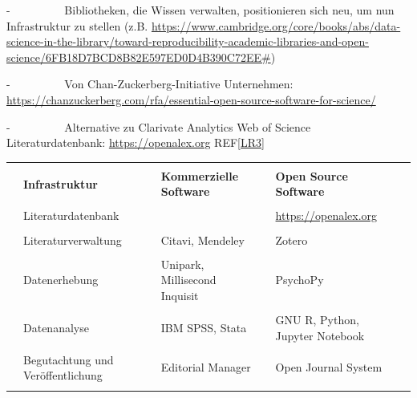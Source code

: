 \documentclass[
  letterpaper,
  DIV=11,
  numbers=noendperiod]{scrreprt}
\begin{document}
-~~~~~~~~~ Bibliotheken, die Wissen verwalten, positionieren sich neu,
um nun Infrastruktur zu stellen (z.B.
\href{https://www.cambridge.org/core/books/abs/data-science-in-the-library/toward-reproducibility-academic-libraries-and-open-science/6FB18D7BCD8B82E597ED0D4B390C72EE}{https://www.cambridge.org/core/books/abs/data-science-in-the-library/toward-reproducibility-academic-libraries-and-open-science/6FB18D7BCD8B82E597ED0D4B390C72EE\#})

-~~~~~~~~~ Von Chan-Zuckerberg-Initiative Unternehmen:
\url{https://chanzuckerberg.com/rfa/essential-open-source-software-for-science/}

-~~~~~~~~~ Alternative zu Clarivate Analytics Web of Science
Literaturdatenbank: \url{https://openalex.org}
REF\hyperref[_msocom_3]{{[}LR3{]}}~

\begin{longtable}[]{@{}
  >{\raggedright\arraybackslash}p{}
  >{\raggedright\arraybackslash}p{}
  >{\raggedright\arraybackslash}p{}
  >{\raggedright\arraybackslash}p{}
  >{\raggedright\arraybackslash}p{}
  >{\raggedright\arraybackslash}p{}
  >{\raggedright\arraybackslash}p{}@{}}
\toprule\noalign{}
\endhead
\bottomrule\noalign{}
\endlastfoot
& & & & & & \\
& \textbf{Infrastruktur} & & \textbf{Kommerzielle Software} & &
\textbf{Open Source Software} & \\
& & & & & & \\
& Literaturdatenbank & & & & \url{https://openalex.org} & \\
& & & & & & \\
& Literaturverwaltung & & Citavi, Mendeley & & Zotero & \\
& & & & & & \\
& Datenerhebung & & Unipark, Millisecond Inquisit & & PsychoPy & \\
& & & & & & \\
& Datenanalyse & & IBM SPSS, Stata & & GNU R, Python, Jupyter Notebook
& \\
& & & & & & \\
& Begutachtung und Veröffentlichung & & Editorial Manager & & Open
Journal System & \\
& & & & & & \\
\end{longtable}
\end{document}
